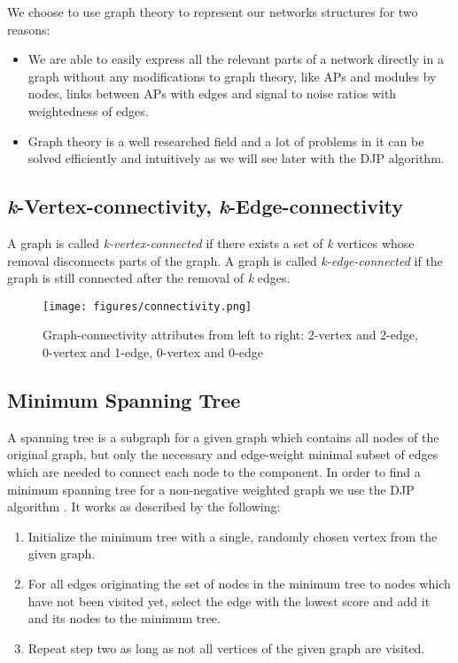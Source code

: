   We choose to use graph theory to represent our networks structures for two reasons:
  \begin{itemize}
   \item We are able to easily express all the relevant parts of a network directly in a graph without any modifications to graph theory,  
   like APs and modules by nodes, links between APs with edges and signal to noise ratios with weightedness of edges. 
    
   \item Graph theory is a well researched field and a lot of problems in it can be solved efficiently and intuitively 
    as we will see later with the \ac{DJP} algorithm.
  \end{itemize}
    
  \subsection{\emph{k}-Vertex-connectivity, \emph{k}-Edge-connectivity}
    A graph is called \textit{k-vertex-connected} if there exists a set of \textit{k} vertices whose removal disconnects parts of the graph.
    A graph is called \textit{k-edge-connected} if the graph is still connected after the removal of \textit{k} edges.
    \begin{figure}[th!]
      \centering
      \texttt{[image: figures/connectivity.png]}
      \caption{Graph-connectivity attributes from left to right: 2-vertex and 2-edge, 0-vertex and 1-edge, 0-vertex and 0-edge}
      \label{fig:connectivity}
    \end{figure}
    
\newpage
    
  \subsection{Minimum Spanning Tree}
    A spanning tree is a subgraph for a given graph which contains all nodes of the original graph, but only the necessary and edge-weight minimal 
    subset of edges which are needed to connect each node to the component. In order to find a minimum spanning tree for a non-negative weighted 
    graph we use the \ac{DJP} algorithm \cite{jarnik, prim}. It works as described by the following:
    
    \begin{enumerate}
     \item Initialize the minimum tree with a single, randomly chosen vertex from the given graph.
     
     \item For all edges originating the set of nodes in the minimum tree to nodes which have not been visited yet, 
      select the edge with the lowest score and add it and its nodes to the minimum tree.
      
     \item Repeat step two as long as not all vertices of the given graph are visited.
    \end{enumerate}
    
